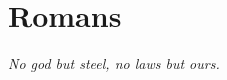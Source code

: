 \documentclass[a4paper]{book}
\begin{document}
\section{\Gls{Romans}}

	\begin{flushright}
		\emph{No god but steel, no laws but ours.}
	\end{flushright}

\newpage{}
\end{document}
